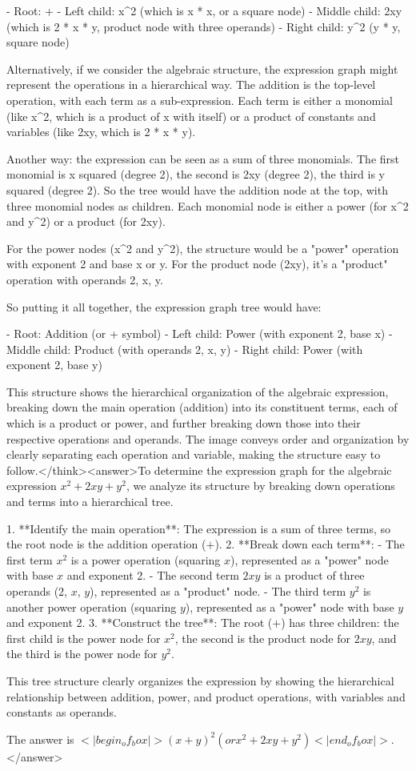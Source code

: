 - Root: +
- Left child: x^2 (which is x * x, or a square node)
- Middle child: 2xy (which is 2 * x * y, product node with three operands)
- Right child: y^2 (y * y, square node)

Alternatively, if we consider the algebraic structure, the expression graph might represent the operations in a hierarchical way. The addition is the top-level operation, with each term as a sub-expression. Each term is either a monomial (like x^2, which is a product of x with itself) or a product of constants and variables (like 2xy, which is 2 * x * y). 

Another way: the expression can be seen as a sum of three monomials. The first monomial is x squared (degree 2), the second is 2xy (degree 2), the third is y squared (degree 2). So the tree would have the addition node at the top, with three monomial nodes as children. Each monomial node is either a power (for x^2 and y^2) or a product (for 2xy). 

For the power nodes (x^2 and y^2), the structure would be a "power" operation with exponent 2 and base x or y. For the product node (2xy), it's a "product" operation with operands 2, x, y. 

So putting it all together, the expression graph tree would have:

- Root: Addition (or + symbol)
  - Left child: Power (with exponent 2, base x)
  - Middle child: Product (with operands 2, x, y)
  - Right child: Power (with exponent 2, base y)

This structure shows the hierarchical organization of the algebraic expression, breaking down the main operation (addition) into its constituent terms, each of which is a product or power, and further breaking down those into their respective operations and operands. The image conveys order and organization by clearly separating each operation and variable, making the structure easy to follow.</think><answer>To determine the expression graph for the algebraic expression \( x^2 + 2xy + y^2 \), we analyze its structure by breaking down operations and terms into a hierarchical tree.  

1. **Identify the main operation**: The expression is a sum of three terms, so the root node is the addition operation (\(+\)).  
2. **Break down each term**:  
   - The first term \( x^2 \) is a power operation (squaring \( x \)), represented as a "power" node with base \( x \) and exponent 2.  
   - The second term \( 2xy \) is a product of three operands (2, \( x \), \( y \)), represented as a "product" node.  
   - The third term \( y^2 \) is another power operation (squaring \( y \)), represented as a "power" node with base \( y \) and exponent 2.  
3. **Construct the tree**: The root (\(+\)) has three children: the first child is the power node for \( x^2 \), the second is the product node for \( 2xy \), and the third is the power node for \( y^2 \).  

This tree structure clearly organizes the expression by showing the hierarchical relationship between addition, power, and product operations, with variables and constants as operands.  

The answer is \(<|begin_of_box|>(x + y)^2 (or x^2 + 2xy + y^2)<|end_of_box|>\).</answer>